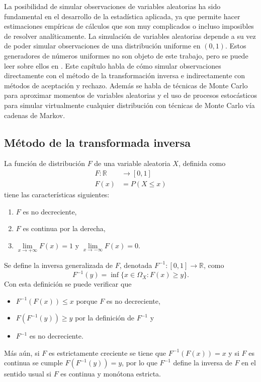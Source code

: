 \documentclass[11pt,a4paper]{article}
\begin{document}
La posibilidad de simular observaciones de variables aleatorias ha sido fundamental en el desarrollo de la estadística aplicada, ya que permite hacer estimaciones empíricas de cálculos que son muy complicados o incluso imposibles de resolver analíticamente. La simulación de variables aleatorias depende a su vez de poder simular observaciones de una distribución uniforme en $(0, 1)$. Estos generadores de números uniformes no son objeto de este trabajo, pero se puede leer sobre ellos en \citet{dagpunar}. Este capítulo habla de cómo simular observaciones directamente con el método de la transformación inversa e indirectamente con métodos de aceptación y rechazo. Además se habla de técnicas de Monte Carlo para aproximar momentos de variables aleatorias y el uso de procesos estocásticos para simular virtualmente cualquier distribución con técnicas de Monte Carlo vía cadenas de Markov.

\subsection{Método de la transformada inversa}
\label{sec:transformada}

La función de distribución $F$ de una variable aleatoria $X$, definida como
\begin{align*}
F: \mathbb{R}&\to [0,1]\\
F(x) &= P\left(X \leq x\right)
\end{align*}
tiene las características siguientes:

\begin{enumerate}
\item $F$ es no decreciente,
\item $F$ es continua por la derecha,
\item $\lim\limits_{x\to +\infty}F(x) = 1$ y $\lim\limits_{x\to -\infty}F(x) = 0$.
\end{enumerate}
Se define la inversa generalizada de $F$, denotada $F^{-1}:[0,1]\to \mathbb{R}$, como $$F^{-1}(y) = \inf \{x\in \Omega_X: F(x) \geq y\}.$$ Con esta definición se puede verificar que
\begin{itemize}
\item $F^{-1}(F(x)) \leq x$ porque $F$ es no decreciente,
\item $F(F^{-1}(y)) \geq y$ por la definición de $F^{-1}$ y
\item $F^{-1}$ es no decreciente.
\end{itemize}
Más aún, si $F$ es estrictamente creciente se tiene que $F^{-1}(F(x)) = x$ y si $F$ es continua se cumple $F(F^{-1}(y)) = y$, por lo que $F^{-1}$ define la inversa de $F$ en el sentido usual si $F$ es continua y monótona estricta.
\end{document}
